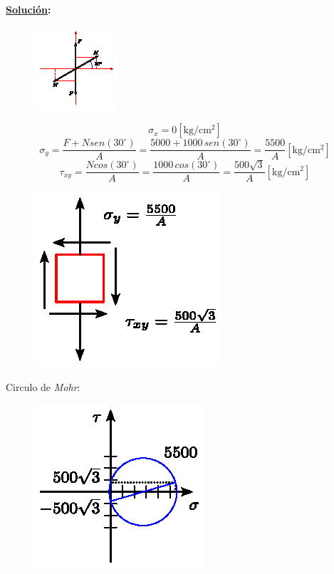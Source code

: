 \documentclass[letter,10pt,twoside]{article}
\begin{document}
\textbf{\underline{Solución}:} \\

\begin{figure}[H]
\centering
\includegraphics[scale=3.4]{resources/f95.eps}
\end{figure}

\begin{equation*}
    \sigma_x = 0[\text{kg}/\text{cm}^2]
\end{equation*}
\begin{equation*}
    \sigma_y = \frac{F + N sen (30^\circ)}{A}
             = \frac{5000 + 1000\,sen (30^\circ)}{A}
             = \frac{5500}{A} [\text{kg}/\text{cm}^2]
\end{equation*}
\begin{equation*}
    \tau_{xy} = \frac{N cos (30^\circ)}{A}
              = \frac{1000\,cos (30^\circ)}{A}
              = \frac{500\sqrt{3}}{A}[\text{kg}/\text{cm}^2]
\end{equation*}

\begin{figure}[H]
\centering
\includegraphics[scale=1.2]{resources/f90.eps}
\end{figure}

Circulo de \emph{Mohr}:

\begin{figure}[H]
\centering
\includegraphics[scale=1.2]{resources/f91.eps}
\end{figure}
\end{document}
